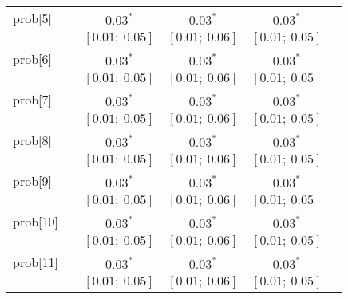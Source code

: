 \begin{table}
\begin{center}
\begin{tabular}{l c c c c c }
prob[5]     &                                  & $0.03^{*}$                & $0.03^{*}$                & $0.03^{*}$              &                         \\
            &                                  & $[0.01;\ 0.05]$           & $[0.01;\ 0.06]$           & $[0.01;\ 0.05]$         &                         \\
prob[6]     &                                  & $0.03^{*}$                & $0.03^{*}$                & $0.03^{*}$              &                         \\
            &                                  & $[0.01;\ 0.05]$           & $[0.01;\ 0.06]$           & $[0.01;\ 0.05]$         &                         \\
prob[7]     &                                  & $0.03^{*}$                & $0.03^{*}$                & $0.03^{*}$              &                         \\
            &                                  & $[0.01;\ 0.05]$           & $[0.01;\ 0.06]$           & $[0.01;\ 0.05]$         &                         \\
prob[8]     &                                  & $0.03^{*}$                & $0.03^{*}$                & $0.03^{*}$              &                         \\
            &                                  & $[0.01;\ 0.05]$           & $[0.01;\ 0.06]$           & $[0.01;\ 0.05]$         &                         \\
prob[9]     &                                  & $0.03^{*}$                & $0.03^{*}$                & $0.03^{*}$              &                         \\
            &                                  & $[0.01;\ 0.05]$           & $[0.01;\ 0.06]$           & $[0.01;\ 0.05]$         &                         \\
prob[10]    &                                  & $0.03^{*}$                & $0.03^{*}$                & $0.03^{*}$              &                         \\
            &                                  & $[0.01;\ 0.05]$           & $[0.01;\ 0.06]$           & $[0.01;\ 0.05]$         &                         \\
prob[11]    &                                  & $0.03^{*}$                & $0.03^{*}$                & $0.03^{*}$              &                         \\
            &                                  & $[0.01;\ 0.05]$           & $[0.01;\ 0.06]$           & $[0.01;\ 0.05]$         &                         \\

\end{tabular}
\end{center}
\end{table}
